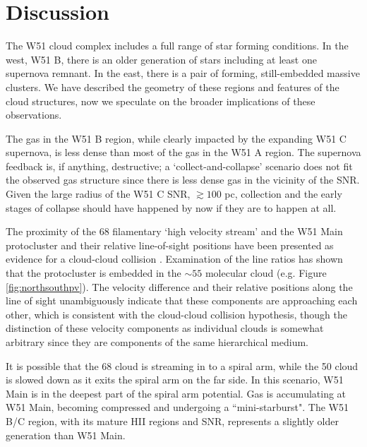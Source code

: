 \section{Discussion}
\label{sec:discussion}
The W51 cloud complex includes a full range of star forming conditions.  In the
west, W51 B, there is an older generation of stars including at least one
supernova remnant.  In the east, there is a pair of forming, still-embedded
massive clusters.  We have described the geometry of these regions and features
of the cloud structures, now we speculate on the broader implications of these
observations.

The gas in the W51 B region, while clearly impacted by the expanding W51 C
supernova, is less dense than most of the gas in the W51 A region.  The
supernova feedback is, if anything, destructive; a `collect-and-collapse'
scenario does not fit the observed gas structure since there is less dense
gas in the vicinity of the SNR.  Given the large radius of the W51 C
SNR, $\gtrsim100$ pc, collection and the early stages of collapse should
have happened by now if they are to happen at all.

The proximity of the 68 \kms filamentary `high velocity stream' and the W51
Main protocluster and their relative line-of-sight positions have been
presented as evidence for a cloud-cloud collision \citep{Kang2010a}.
Examination of the \formaldehyde line ratios has shown that the protocluster is
embedded in the $\sim55$ \kms molecular cloud (e.g. Figure
\ref{fig:northsouthpv}).  The velocity difference and their relative positions
along the line of sight unambiguously indicate that these
components are approaching each other, which is consistent with the cloud-cloud
collision hypothesis, though the distinction of these velocity components
as individual clouds is somewhat arbitrary since they are components of the same
hierarchical medium.

It is possible that the 68 \kms cloud is streaming in to a spiral arm, while
the 50 \kms cloud is slowed down as it exits the spiral arm on the far side.
In this scenario, W51 Main is in the deepest part of the spiral arm potential.
Gas is accumulating at W51 Main,  becoming compressed and undergoing a
``mini-starburst".  The W51 B/C region, with its mature HII
regions and SNR, represents a slightly older generation than W51 Main.



